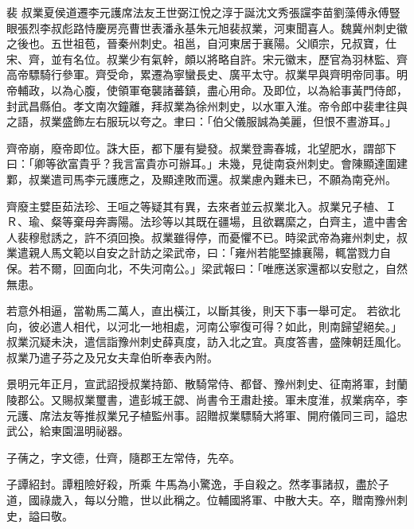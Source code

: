 
\begin{pinyinscope}

 裴
 叔業夏侯道遷李元護席法友王世弼江悅之淳于誕沈文秀張讜李苗劉藻傅永傅豎眼張烈李叔彪路恃慶房亮曹世表潘永基朱元旭裴叔業，河東聞喜人。魏冀州刺史徽之後也。五世祖苞，晉秦州刺史。祖邕，自河東居于襄陽。父順宗，兄叔寶，仕
 宋、齊，並有名位。叔業少有氣幹，頗以將略自許。宋元徽末，歷官為羽林監、齊高帝驃騎行參軍。齊受命，累遷為寧蠻長史、廣平太守。叔業早與齊明帝同事。明帝輔政，以為心腹，使領軍奄襲諸蕃鎮，盡心用命。及即位，以為給事黃門侍郎，封武昌縣伯。孝文南次鐘離，拜叔業為徐州刺史，以水軍入淮。帝令郎中裴聿往與之語，叔業盛飾左右服玩以夸之。聿曰：「伯父儀服誠為美麗，但恨不晝游耳。」



 齊帝崩，廢帝即位。誅大臣，都下屢有變發。叔業登壽春城，北望肥水，謂部下曰：「卿等欲富貴乎？我言富貴亦可辦耳。」未幾，見徙南袞州刺史。會陳顯達圍建
 鄴，叔業遣司馬李元護應之，及顯達敗而還。叔業慮內難未已，不願為南兗州。



 齊廢主嬖臣茹法珍、王咺之等疑其有異，去來者並云叔業北入。叔業兄子植、ＩＲ、瑜、粲等棄母奔壽陽。法珍等以其既在疆場，且欲羈縻之，白齊主，遣中書舍人裴穆慰誘之，許不須回換。叔業雖得停，而憂懼不已。時梁武帝為雍州刺史，叔業遣親人馬文範以自安之計訪之梁武帝，曰：「雍州若能堅據襄陽，輒當戮力自保。若不爾，回面向北，不失河南公。」梁武報曰：「唯應送家還都以安慰之，自然無患。



 若意外相逼，當勒馬二萬人，直出橫江，以斷其後，則天下事一舉可定。
 若欲北向，彼必遣人相代，以河北一地相處，河南公寧復可得？如此，則南歸望絕矣。」叔業沉疑未決，遣信詣豫州刺史薛真度，訪入北之宜。真度答書，盛陳朝廷風化。叔業乃遣子芬之及兄女夫韋伯昕奉表內附。



 景明元年正月，宣武詔授叔業持節、散騎常侍、都督、豫州刺史、征南將軍，封蘭陵郡公。又賜叔業璽書，遣彭城王勰、尚書令王肅赴接。軍未度淮，叔業病卒，李元護、席法友等推叔業兄子植監州事。詔贈叔業驃騎大將軍、開府儀同三司，謚忠武公，給東園溫明祕器。



 子蒨之，字文德，仕齊，隨郡王左常侍，先卒。



 子譚紹封。譚粗險好殺，所乘
 牛馬為小驚逸，手自殺之。然孝事諸叔，盡於子道，國祿歲入，每以分贍，世以此稱之。位輔國將軍、中散大夫。卒，贈南豫州刺史，謚曰敬。




\end{pinyinscope}
